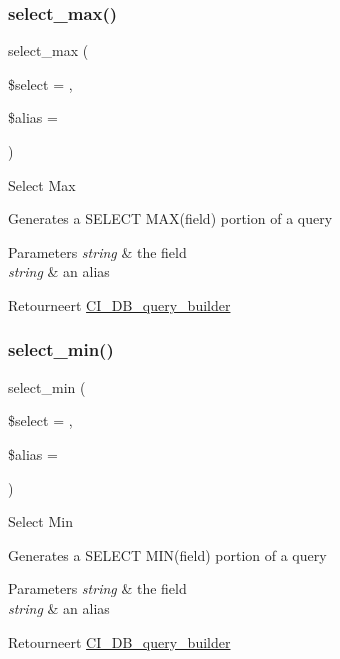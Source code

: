 \subsubsection{\texorpdfstring{select\_max()}{select\_max()}}
{\footnotesize\ttfamily select\+\_\+max (\begin{DoxyParamCaption}\item[{}]{\$select = {\ttfamily \textquotesingle{}\textquotesingle{}},  }\item[{}]{\$alias = {\ttfamily \textquotesingle{}\textquotesingle{}} }\end{DoxyParamCaption})}

Select Max

Generates a S\+E\+L\+E\+CT M\+A\+X(field) portion of a query


\begin{DoxyParams}{Parameters}
{\em string} & the field \\
\hline
{\em string} & an alias \\
\hline
\end{DoxyParams}
\begin{DoxyReturn}{Retourneert}
\mbox{\hyperlink{class_c_i___d_b__query__builder}{C\+I\+\_\+\+D\+B\+\_\+query\+\_\+builder}} 
\end{DoxyReturn}
\mbox{\label{class_c_i___d_b__query__builder_ab8cf650dd779435da91d6f50bf082528}} 
\subsubsection{\texorpdfstring{select\_min()}{select\_min()}}
{\footnotesize\ttfamily select\+\_\+min (\begin{DoxyParamCaption}\item[{}]{\$select = {\ttfamily \textquotesingle{}\textquotesingle{}},  }\item[{}]{\$alias = {\ttfamily \textquotesingle{}\textquotesingle{}} }\end{DoxyParamCaption})}

Select Min

Generates a S\+E\+L\+E\+CT M\+I\+N(field) portion of a query


\begin{DoxyParams}{Parameters}
{\em string} & the field \\
\hline
{\em string} & an alias \\
\hline
\end{DoxyParams}
\begin{DoxyReturn}{Retourneert}
\mbox{\hyperlink{class_c_i___d_b__query__builder}{C\+I\+\_\+\+D\+B\+\_\+query\+\_\+builder}} 
\end{DoxyReturn}
\mbox{\label{class_c_i___d_b__query__builder_a42348c349cf2fa7ca0210087efcf98d3}} 
